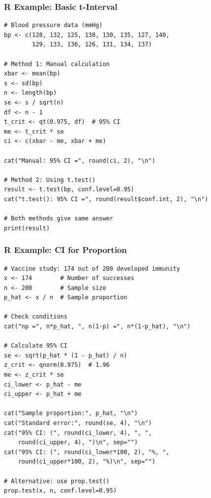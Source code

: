 \documentclass{beamer}
\begin{document}
\begin{frame}[fragile]
\frametitle{R Example: Basic t-Interval}
\small
\begin{verbatim}
# Blood pressure data (mmHg)
bp <- c(128, 132, 125, 138, 130, 135, 127, 140,
        129, 133, 136, 126, 131, 134, 137)

# Method 1: Manual calculation
xbar <- mean(bp)
s <- sd(bp)
n <- length(bp)
se <- s / sqrt(n)
df <- n - 1
t_crit <- qt(0.975, df)  # 95% CI
me <- t_crit * se
ci <- c(xbar - me, xbar + me)

cat("Manual: 95% CI =", round(ci, 2), "\n")

# Method 2: Using t.test()
result <- t.test(bp, conf.level=0.95)
cat("t.test(): 95% CI =", round(result$conf.int, 2), "\n")

# Both methods give same answer
print(result)
\end{verbatim}
\end{frame}

\begin{frame}[fragile]
\frametitle{R Example: CI for Proportion}
\small
\begin{verbatim}
# Vaccine study: 174 out of 200 developed immunity
x <- 174        # Number of successes
n <- 200        # Sample size
p_hat <- x / n  # Sample proportion

# Check conditions
cat("np =", n*p_hat, ", n(1-p) =", n*(1-p_hat), "\n")

# Calculate 95% CI
se <- sqrt(p_hat * (1 - p_hat) / n)
z_crit <- qnorm(0.975)  # 1.96
me <- z_crit * se
ci_lower <- p_hat - me
ci_upper <- p_hat + me

cat("Sample proportion:", p_hat, "\n")
cat("Standard error:", round(se, 4), "\n")
cat("95% CI: (", round(ci_lower, 4), ", ",
    round(ci_upper, 4), ")\n", sep="")
cat("95% CI: (", round(ci_lower*100, 2), "%, ",
    round(ci_upper*100, 2), "%)\n", sep="")

# Alternative: use prop.test()
prop.test(x, n, conf.level=0.95)
\end{verbatim}
\end{frame}
\end{document}
